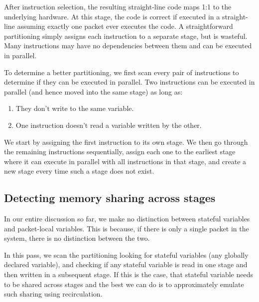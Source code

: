 After instruction selection, the resulting straight-line code maps 1:1 to the
underlying hardware. At this stage, the code is correct if executed in a
straight-line assuming exactly one packet ever executes the code. A
straightforward partitioning simply assigns each instruction to a separate
stage, but is wasteful. Many instructions may have no dependencies between them
and can be executed in parallel.

To determine a better partitioning, we first scan every pair of instructions
to determine if they can be executed in parallel. Two instructions can be
executed in parallel (and hence moved into the same stage) as long as:
\begin{enumerate}
\item They don't write to the same variable.
\item One instruction doesn't read a variable written by the other.
\end{enumerate}
We start by assigning the first instruction to its own stage. We then go
through the remaining instructions sequentially, assign each one to the
earliest stage where it can execute in parallel with all instructions in that
stage, and create a new stage every time such a stage does not exist.



\subsection{Detecting memory sharing across stages}
In our entire discussion so far, we make no distinction between stateful
variables and packet-local variables. This is because, if there is only a
single packet in the system, there is no distinction between the two.

In this pass, we scan the partitioning looking for stateful variables (any
globally declared variable), and checking if any stateful variable is read in
one stage and then written in a subsequent stage. If this is the case, that
stateful variable needs to be shared across stages and the best we can do is to
approximately emulate such sharing using recirculation.

